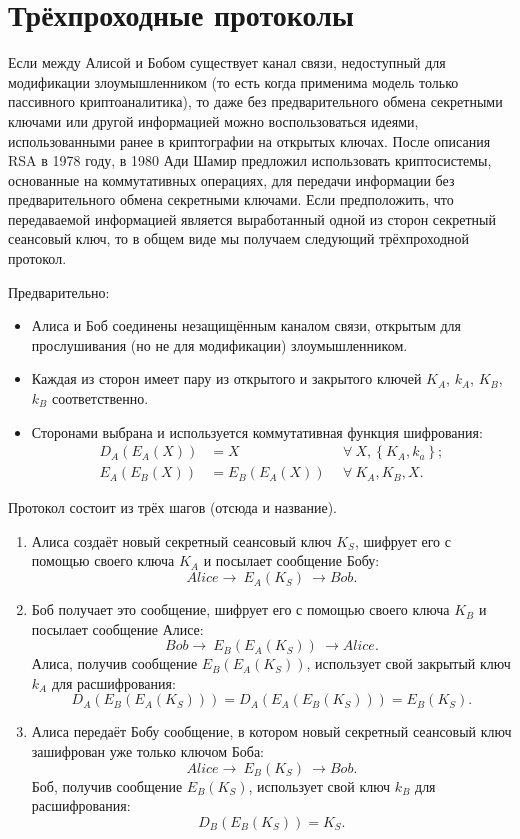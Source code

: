 \section{Трёхпроходные протоколы}

Если между Алисой и Бобом существует канал связи, недоступный для модификации злоумышленником (то есть когда применима модель только пассивного криптоаналитика), то даже без предварительного обмена секретными ключами или другой информацией можно воспользоваться идеями, использованными ранее в криптографии на открытых ключах. После описания RSA в 1978 году, в 1980 Ади Шамир предложил использовать криптосистемы, основанные на коммутативных операциях, для передачи информации без предварительного обмена секретными ключами. Если предположить, что передаваемой информацией является выработанный одной из сторон секретный сеансовый ключ, то в общем виде мы получаем следующий трёхпроходной протокол.

Предварительно:

\begin{itemize}
	\item Алиса и Боб соединены незащищённым каналом связи, открытым для прослушивания (но не для модификации) злоумышленником.
	\item Каждая из сторон имеет пару из открытого и закрытого ключей $K_A$, $k_A$, $K_B$, $k_B$ соответственно.
	\item Сторонами выбрана и используется коммутативная функция шифрования:
	\begin{align*}
		D_{A} \left( E_{A} \left( X \right) \right)	&= X		& ~~\forall ~ X, \left\{ K_A, k_a \right\}; \\
		E_{A} \left( E_{B} \left( X \right) \right)	&= E_B \left( E_A \left( X \right) \right) & ~~\forall ~ K_A, K_B, X.
	\end{align*}
\end{itemize}

Протокол состоит из трёх шагов (отсюда и название).
\begin{enumerate}
    \item Алиса создаёт новый секретный сеансовый ключ $K_S$, шифрует его с помощью своего ключа $K_A$ и посылает сообщение Бобу:
        \[ Alice \rightarrow ~ E_A \left( K_S \right) ~ \rightarrow Bob. \]
    \item Боб получает это сообщение, шифрует его с помощью своего ключа $K_B$ и посылает сообщение Алисе:
        \[ Bob \rightarrow ~ E_B \left( E_A \left( K_S \right) \right) ~ \rightarrow Alice. \]
    Алиса, получив сообщение $E_B \left( E_A \left( K_S \right) \right)$, использует свой закрытый ключ $k_A$ для расшифрования:
	\[ D_A \left( E_B \left( E_A \left( K_S \right) \right) \right) = D_A \left( E_A \left( E_B \left( K_S \right) \right) \right) = E_B \left( K_S \right). \]
    \item Алиса передаёт Бобу сообщение, в котором новый секретный сеансовый ключ зашифрован уже только ключом Боба:
        \[ Alice \rightarrow ~ E_B \left( K_S \right) ~ \rightarrow Bob. \]
    Боб, получив сообщение $E_B \left( K_S \right)$, использует свой ключ $k_B$ для расшифрования:
	\[ D_B \left( E_B \left( K_S \right) \right) = K_S. \]
\end{enumerate}


